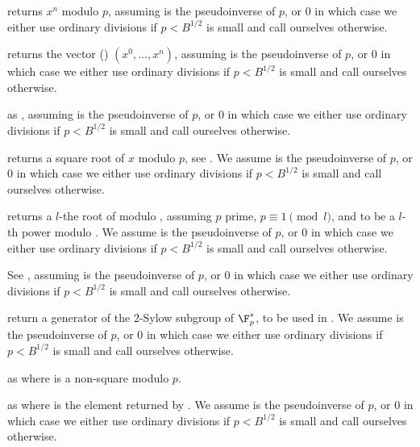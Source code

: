  returns
$x^n$ modulo $p$, assuming  is the pseudoinverse of $p$, or $0$
in which case we either use ordinary divisions if $p < B^{1/2}$ is small
and call  ourselves otherwise.

 returns
the vector () $(x^0, \dots, x^n)$, assuming  is
the pseudoinverse of $p$, or $0$ in which case we either use ordinary
divisions if $p < B^{1/2}$ is small and call  ourselves
otherwise.

as , assuming  is the pseudoinverse of $p$, or $0$ in
which case we either use ordinary divisions if $p < B^{1/2}$ is small and
call  ourselves otherwise.

 returns a square root
of $x$ modulo $p$, see . We assume  is the
pseudoinverse of $p$, or $0$ in which case we either use ordinary divisions
if $p < B^{1/2}$ is small and call  ourselves otherwise.

returns a $l$-the root of  modulo , assuming
$p$ prime, $p \equiv 1 \pmod{l}$, and  to be a $l$-th power modulo
. We assume  is the pseudoinverse of $p$, or $0$ in which case
we either use ordinary divisions if $p < B^{1/2}$ is small and call
 ourselves otherwise.

See , assuming  is the pseudoinverse of $p$, or $0$ in
which case we either use ordinary divisions if $p < B^{1/2}$ is small and
call  ourselves otherwise.

 return a generator of
the $2$-Sylow subgroup of $\F_p^*$, to be used in .
We assume  is the pseudoinverse of $p$, or $0$ in which case we
either use ordinary divisions if $p < B^{1/2}$ is small and call
 ourselves otherwise.

as  where  is a non-square modulo $p$.

as  where  is the element returned by
. We assume  is the pseudoinverse of $p$, or $0$
in which case we either use ordinary divisions if $p < B^{1/2}$ is small and
call  ourselves otherwise.

